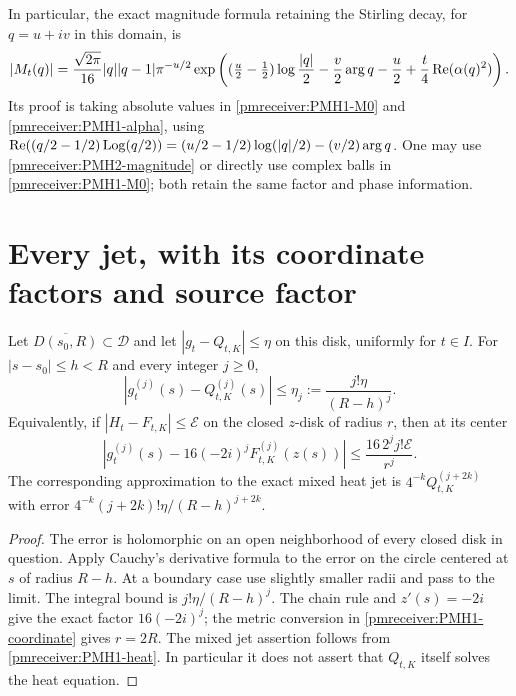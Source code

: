 \documentclass[11pt]{article}
\begin{document}
In particular, the exact magnitude formula retaining the Stirling
decay, for $q=u+iv$ in this domain, is
\begin{equation}\label{pmreceiver:PMH2-magnitude}
 |M_t(q)|=\frac{\sqrt{2\pi}}{16}|q||q-1|\pi^{-u/2}
 \exp\left((\tfrac u2-\tfrac12)\log\frac{|q|}{2}
 -\frac v2\arg q-\frac u2+\frac t4\operatorname{Re}(\alpha(q)^2)\right).
\end{equation}
Its proof is taking absolute values in \eqref{pmreceiver:PMH1-M0} and
\eqref{pmreceiver:PMH1-alpha}, using
$\operatorname{Re}((q/2-1/2)\operatorname{Log}(q/2))=(u/2-1/2)\log(|q|/2)-(v/2)\arg q$.
One may use \eqref{pmreceiver:PMH2-magnitude} or directly use complex balls in
\eqref{pmreceiver:PMH1-M0}; both retain the same factor and phase information.

\section{Every jet, with its coordinate factors and source factor}

\begin{pmreceivertheorem}
\label{pmreceiver:PMH3}
Let $\overline{D(s_0,R)}\subset\mathcal D$ and let
$|g_t-Q_{t,K}|\le\eta$ on this disk, uniformly for $t\in I$.
For $|s-s_0|\le h<R$ and every integer $j\ge0$,
\begin{equation}\label{pmreceiver:PMH3-sjet}
 |g_t^{(j)}(s)-Q_{t,K}^{(j)}(s)|
 \le\eta_j:=\frac{j!\eta}{(R-h)^j}.
\end{equation}
Equivalently, if $|H_t-F_{t,K}|\le\mathcal E$ on the closed
$z$-disk of radius $r$, then at its center
\begin{equation}\label{pmreceiver:PMH3-zjet}
 \left|g_t^{(j)}(s)-16(-2i)^jF_{t,K}^{(j)}(z(s))\right|
 \le\frac{16\,2^j j!\mathcal E}{r^j}.
\end{equation}
The corresponding approximation to the exact mixed heat jet is
$4^{-k}Q_{t,K}^{(j+2k)}$ with error
$4^{-k}(j+2k)!\eta/(R-h)^{j+2k}$.
\end{pmreceivertheorem}
\begin{proof}
The error is holomorphic on an open neighborhood of every closed
disk in question. Apply Cauchy's derivative formula to the error on
the circle centered at $s$ of radius $R-h$. At a boundary case use
slightly smaller radii and pass to the limit. The integral bound is
$j!\eta/(R-h)^j$. The chain rule and
$z'(s)=-2i$ give the exact factor $16(-2i)^j$;
the metric conversion in \eqref{pmreceiver:PMH1-coordinate} gives $r=2R$.
The mixed jet assertion follows from \eqref{pmreceiver:PMH1-heat}.
In particular it does not assert that $Q_{t,K}$ itself solves the
heat equation.
\end{proof}
\end{document}
